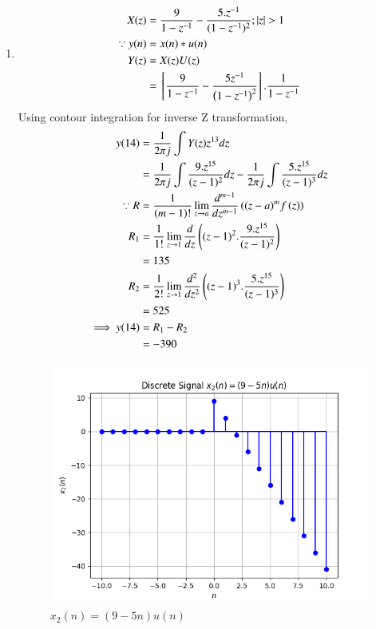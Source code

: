 \documentclass[journal,12pt,twocolumn]{IEEEtran}
\theoremstyle{remark}
\begin{document}
\begin{enumerate}
    \item \begin{align}
         X(z) &= \frac{9}{1-z^{-1}} - \frac{5.z^{-1}}{(1-z^{-1})^2} ; |z|>1\\
        \because y(n) &= x(n) * u(n)\\
        Y(z) &= X(z)U(z)\\
         &= \sbrak{\frac{9}{1-z^{-1}} - \frac{5 z^{-1}}{\brak{1-z^{-1}}^2} }.\frac{1}{1-z^{-1}}
    \end{align}
    Using contour integration for inverse Z transformation,
    \begin{align}
        y(14) &= \frac{1}{2\pi j}\int Y(z) z^{13} dz \\
         &= \frac{1}{2\pi j}\int \frac{9.z^{15}}{(z-1)^{2}} dz - \frac{1}{2\pi j}\int \frac{5.z^{15}}{(z-1)^{3}} dz\\
        \because R&=\frac{1}{\left(m-1\right)!}\lim\limits_{z\to a}\frac{d^{m-1}}{dz^{m-1}}\left({(z-a)}^{m}f\left(z\right)\right)\\
        R_1 &=\frac{1}{1!}\lim\limits_{z\to 1}\frac{d}{dz}\left((z-1)^2.\frac{9.z^{15}}{(z-1)^{2}}\right)\\
         &= 135\\
        R_2 &=\frac{1}{2!}\lim\limits_{z\to 1}\frac{d^2}{dz^2}\left((z-1)^3.\frac{5.z^{15}}{(z-1)^{3}}\right)\\
         &= 525\\
        \implies y(14) &= R_1 - R_2 \\
        &= -390
    \end{align}
    
    \begin{figure}[!h] 
    \centering
    \includegraphics[width=\columnwidth]{figs/signal_x2.png}
    \caption{$x_2(n)=(9-5n)u(n)$}
    \label{fig:Graph2}
    \end{figure}

\end{enumerate}
\end{document}
